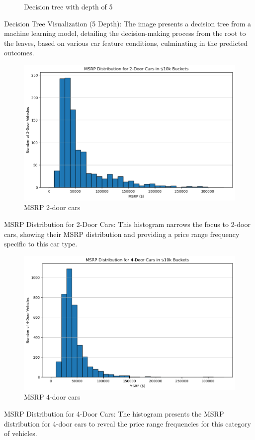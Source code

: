 \documentclass{article}
\begin{document}
\begin{figure}[h]
\caption{Decision tree with depth of 5}
\end{figure}
Decision Tree Visualization (5 Depth): The image presents a decision tree from a machine learning model, detailing the decision-making process from the root to the leaves, based on various car feature conditions, culminating in the predicted outcomes.

\begin{figure}[h]
\caption{MSRP 2-door cars}
\includegraphics[scale=0.5]{MSRP 2-door 10k less.png}\newline
\end{figure}
MSRP Distribution for 2-Door Cars: This histogram narrows the focus to 2-door cars, showing their MSRP distribution and providing a price range frequency specific to this car type.
\begin{figure}[h]
\caption{MSRP 4-door cars}
\includegraphics[scale=0.5]{MSRP 4-door 10k less.png}\newline
\end{figure}
MSRP Distribution for 4-Door Cars: The histogram presents the MSRP distribution for 4-door cars to reveal the price range frequencies for this category of vehicles.
\end{document}
